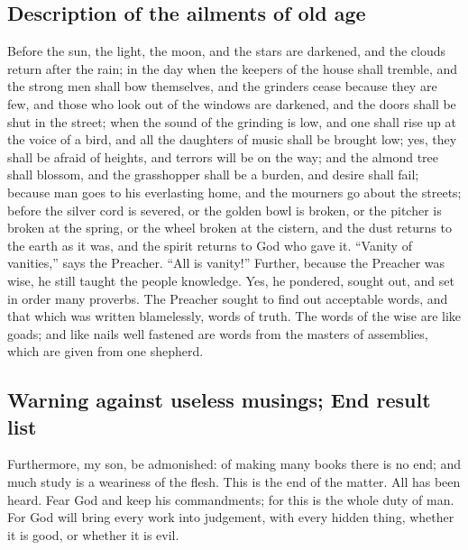 \hypertarget{description-of-the-ailments-of-old-age}{%
\subsection{Description of the ailments of old
age}\label{description-of-the-ailments-of-old-age}}

 Before the sun, the light, the moon, and the stars are
darkened, and the clouds return after the rain;  in the
day when the keepers of the house shall tremble, and the strong men
shall bow themselves, and the grinders cease because they are few, and
those who look out of the windows are darkened,  and the
doors shall be shut in the street; when the sound of the grinding is
low, and one shall rise up at the voice of a bird, and all the daughters
of music shall be brought low;  yes, they shall be afraid
of heights, and terrors will be on the way; and the almond tree shall
blossom, and the grasshopper shall be a burden, and desire shall fail;
because man goes to his everlasting home, and the mourners go about the
streets;  before the silver cord is severed, or the golden
bowl is broken, or the pitcher is broken at the spring, or the wheel
broken at the cistern,  and the dust returns to the earth
as it was, and the spirit returns to God who gave it. 
``Vanity of vanities,'' says the Preacher. ``All is vanity!''
 Further, because the Preacher was wise, he still taught
the people knowledge. Yes, he pondered, sought out, and set in order
many proverbs.  The Preacher sought to find out
acceptable words, and that which was written blamelessly, words of
truth.  The words of the wise are like goads; and like
nails well fastened are words from the masters of assemblies, which are
given from one shepherd.

\hypertarget{warning-against-useless-musings-end-result-list}{%
\subsection{Warning against useless musings; End result
list}\label{warning-against-useless-musings-end-result-list}}

 Furthermore, my son, be admonished: of making many books
there is no end; and much study is a weariness of the flesh.
 This is the end of the matter. All has been heard. Fear
God and keep his commandments; for this is the whole duty of man.
 For God will bring every work into judgement, with every
hidden thing, whether it is good, or whether it is evil.
